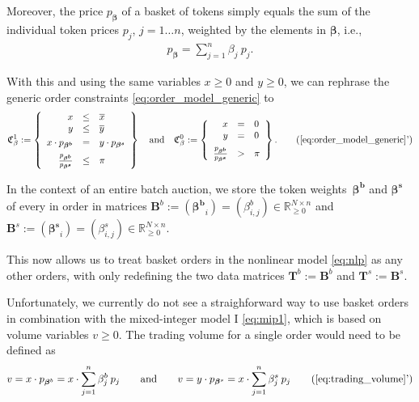 \documentclass[11pt,parskip=full]{scrartcl}%
\newcommand*{\ie}{i.e., }
\begin{document}
Moreover, the price $p_{\bm{\beta}}$ of a basket of tokens simply equals the sum of the individual
token prices $p_j$, $j=1 \ldots n$, weighted by the elements in $\bm{\beta}$, \ie
\begin{align}
  p_{\bm{\beta}} = \sum\limits_{j=1}^n \beta_j \> p_j.
\end{align}

With this and using the same variables $x \ge 0$ and $y \ge 0$, we can rephrase the generic order
constraints \eqref{eq:order_model_generic} to
\begin{align}
  \mathfrak{C}^1_\beta := \left\{
  \begin{array}{rll}
    x &\le & \overline{x} \\
    y &\le & \overline{y} \\[1mm]
    x \cdot p_{\bm{\beta^b}} &= & y \cdot p_{\bm{\beta^s}} \\[2mm]
    \frac{p_{\bm{\beta^b}}}{p_{\bm{\beta^s}}} &\le & \pi
  \end{array}
  \right\}
  \quad
  \text{and}
  \quad
  \mathfrak{C}^0_\beta := \left\{
  \begin{array}{rll}
    x &= & 0 \\
    y &= & 0 \\[2mm]
    \frac{p_{\bm{\beta^b}}}{p_{\bm{\beta^s}}} &> & \pi
  \end{array}
  \right\}.
  \tag{\ref{eq:order_model_generic}'}
  \label{eq:basket_order_model_generic}
\end{align}

In the context of an entire batch auction, we store the token
weights~$\bm{\beta^b}$ and $\bm{\beta^s}$ of every in order in matrices
$\mathbf{B}^b := (\bm{\beta^b}_i) = (\beta^b_{i,j}) \in \mathbb{R}_{\ge 0}^{N \times n}$ and
$\mathbf{B}^s := (\bm{\beta^s}_i) = (\beta^s_{i,j}) \in \mathbb{R}_{\ge 0}^{N \times n}$.

This now allows us to treat basket orders in the nonlinear model \eqref{eq:nlp} as any other
orders, with only redefining the two data matrices
$\mathbf{T}^b := \mathbf{B}^b$ and $\mathbf{T}^s := \mathbf{B}^s$.

Unfortunately, we currently do not see a straighforward way to use basket orders in combination
with the mixed-integer model I \eqref{eq:mip1}, which is based on volume variables $v \ge 0$.
The trading volume for a single order would need to be defined as
\begin{align}
  v = x \cdot p_{\bm{\beta}^b} = x \cdot \sum\limits_{j=1}^n \beta_j^b \> p_j
  \qquad \text{and} \qquad
  v = y \cdot p_{\bm{\beta}^s} = x \cdot \sum\limits_{j=1}^n \beta_j^s \> p_j
  \tag{\ref{eq:trading_volume}'}
  \label{eq:basket_trading_volume}
\end{align}
\end{document}
